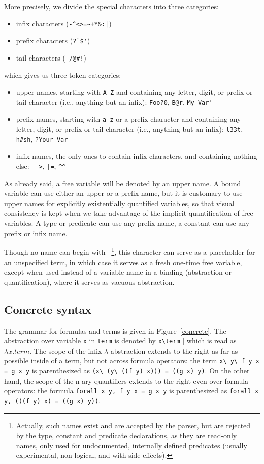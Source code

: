 More precisely, we divide the special characters into three categories:
\begin{itemize}
  \item infix characters (\verb.-^<>=~+*&:|.)
  \item prefix characters (\verb.?`$'.)
  \item tail characters (\verb._/@#!.)
\end{itemize}
which gives us three token categories:
\begin{itemize}
  \item upper names, starting with \verb.A-Z. and containing any letter,
    digit, or prefix or tail character (i.e., anything but an infix):
    \verb.Foo?0., \verb.B@r., \verb.My_Var'.
  \item prefix names, starting with \verb.a-z. or a prefix character and
    containing any letter, digit, or prefix or tail character (i.e.,
    anything but an infix): \verb.l33t., \verb.h#sh., \verb.?Your_Var.
  \item infix names, the only ones to contain infix characters, and
    containing nothing else: \verb.-->., \verb.|=., \verb.^^.
\end{itemize}
As already said, a free variable will be denoted by an upper name. A
bound variable can use either an upper or a prefix name, but it is
customary to use upper names for explicitly existentially quantified
variables, so that visual consistency is kept when we take advantage of
the implicit quantification of free variables. A type or predicate can
use any prefix name, a constant can use any prefix or infix name.

Though no name can begin with \verb._.\footnote{Actually, such names
exist and are accepted by the parser, but are rejected by the type,
constant and predicate declarations, as they are read-only names, only
used for undocumented, internally defined predicates (usually
experimental, non-logical, and with side-effects).}, this character can
serve as a placeholder for an unspecified term, in which case it serves
as a fresh one-time free variable, except when used instead of a
variable name in a binding (abstraction or quantification), where it
serves as vacuous abstraction.

\subsection{Concrete syntax}

The grammar for formulas and terms is given in Figure~\ref{concrete}.
The abstraction over variable \verb.x. in \verb.term. is denoted by
\verb.x\term. | which is read as $\lambda x. term$. The scope of the
infix $\lambda$-abstraction extends to the right as far as possible
inside of a term, but not across formula operators: the term
\verb.x\ y\ f y x = g x y. is parenthesized as
\verb.(x\ (y\ ((f y) x))) = ((g x) y)..
On the other hand, the scope of the n-ary quantifiers extends to the
right even over formula operators: the formula
{\tt forall x y, f y x = g x y} is parenthesized as
{\tt forall x y, (((f y) x) = ((g x) y))}.


